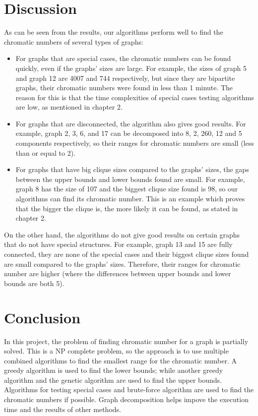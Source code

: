 \documentclass[a4paper]{report}
\begin{document}
	\chapter{Discussion}
	As can be seen from the results, our algorithms perform well to find the chromatic numbers of several types of graphs:
	\begin{itemize}
		\item For graphs that are special cases, the chromatic numbers can be found quickly, even if the graphs' sizes are large. For example, the sizes of graph 5 and graph 12 are 4007 and 744 respectively, but since they are bipartite graphs, their chromatic numbers were found in less than 1 minute. The reason for this is that the time complexities of special cases testing algorithms are low, as mentioned in chapter 2.
		\item For graphs that are disconnected, the algorithm also gives good results. For example, graph 2, 3, 6, and 17 can be decomposed into 8, 2, 260, 12 and 5 components respectively, so their ranges for chromatic numbers are small (less than or equal to 2).
		\item For graphs that have big clique sizes compared to the graphs' sizes, the gaps between the upper bounds and lower bounds found are small. For example, graph 8 has the size of 107 and the biggest clique size found is 98, so our algorithms can find its chromatic number. This is an example which proves that the bigger the clique is, the more likely it can be found, as stated in chapter 2.
	\end{itemize}
	On the other hand, the algorithms do not give good results on certain graphs that do not have special structures. For example, graph 13 and 15 are fully connected, they are none of the special cases and their biggest clique sizes found are small compared to the graphs' sizes. Therefore, their ranges for chromatic number are higher (where the differences between upper bounds and lower bounds are both 5).
	
	\chapter{Conclusion}
	In this project, the problem of finding chromatic number for a graph is partially solved. This is a NP complete problem, so the approach is to use multiple combined algorithms to find the smallest range for the chromatic number. A greedy algorithm is used to find the lower bounds; while another greedy algorithm and the genetic algorithm are used to find the upper bounds. Algorithms for testing special cases and brute-force algorithm are used to find the chromatic numbers if possible. Graph decomposition helps impove the execution time and the results of other methods. \\
	
\end{document}
